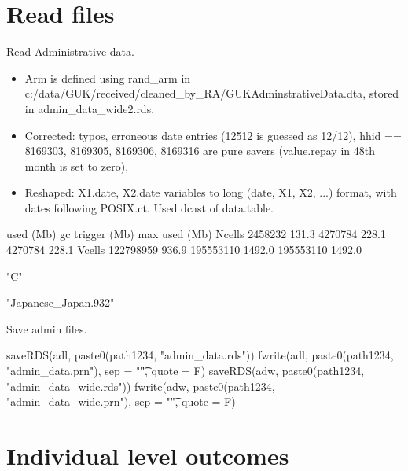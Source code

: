 \section{Read files}

Read Administrative data. 
\begin{itemize}
\vspace{1.0ex}\setlength{\itemsep}{1.0ex}\setlength{\baselineskip}{12pt}
\item	\textsf{Arm} is defined using \textsf{rand\_arm} in {\footnotesize c:/data/GUK/received/cleaned\_by\_RA/GUKAdminstrativeData.dta}, stored in \textsf{admin\_data\_wide2.rds}.
\item	Corrected: typos, erroneous date entries (12512 is guessed as 12/12), hhid == 8169303, 8169305, 8169306, 8169316 are pure savers (value.repay in 48th month is set to zero), 
\item	Reshaped: X1.date, X2.date variables to long (date, X1, X2, ...) format, with dates following POSIX.ct. Used dcast of data.table.
\end{itemize}
\gobblepars
\begin{Schunk}
\begin{Soutput}
            used  (Mb) gc trigger   (Mb)  max used   (Mb)
Ncells   2458232 131.3    4270784  228.1   4270784  228.1
Vcells 122798959 936.9  195553110 1492.0 195553110 1492.0
\end{Soutput}
\end{Schunk}

\begin{Schunk}
\begin{Soutput}
[1] "C"
\end{Soutput}
\begin{Soutput}
[1] "Japanese_Japan.932"
\end{Soutput}
\end{Schunk}




Save admin files.
\begin{Schunk}
\begin{Sinput}
saveRDS(adl, paste0(path1234, "admin_data.rds"))
fwrite(adl, paste0(path1234, "admin_data.prn"), sep = "\t", quote = F)
saveRDS(adw, paste0(path1234, "admin_data_wide.rds"))
fwrite(adw, paste0(path1234, "admin_data_wide.prn"), sep = "\t", quote = F)
\end{Sinput}
\end{Schunk}

\section{Individual level outcomes}

